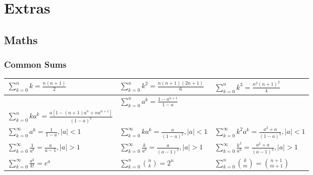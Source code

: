 \documentclass[twoside]{article}
\renewcommand{\arraystretch}{1.5} %
\begin{document}
{
[\vspace{2em}]
\section*{Extras}
}
{
\subsection*{Maths}
}
{
\subsubsection*{Common Sums}
}
\vspace{1em}
\bgroup
\def\arraystretch{3}
{\normalsize
  \begin{center}
    \begin{tabular}{| >{\centering}m{5cm}| >{\centering}m{5cm}| >{\centering}m{5cm}|}
      \hline
      $\sum_{k = 0}^n k = \frac{n(n + 1)}{2}$
       &
      $\sum_{k = 0}^n k^2 = \frac{n(n + 1)(2n + 1)}{6}$
       &
      $\sum_{k = 0}^n k^3 = \frac{n^2(n + 1)^2}{4}$
      \tabularnewline \hline
      \multicolumn{2}{|c|}{$\sum_{k = 0}^n k^4 = \frac{n}{30} (n + 1)(2n + 1)(3n^2 + 3n - 1)$}
       &
      $\sum_{k = 0}^n a^k = \frac{1 - a^{n + 1}}{1 - a}$
      \tabularnewline \hline
      $\sum_{k = 0}^n ka^k = \frac{a[1 - (n + 1)a^n + na^{n + 1}]}{(1 - a)^2}$
       &
      \multicolumn{2}{c|}{
      $\sum_{k = 0}^n k^2a^k = \frac{a[(1 + a) - (n + 1)^2a^n + (2n^2 + 2n - 1)a^{n + 1} - n^2a^{n + 2}]}{(1 - a)^3}$
      }
      \tabularnewline \hline
      $\sum_{k = 0}^\infty a^k = \frac{1}{1 - a}, |a| < 1$
       &
      $\sum_{k = 0}^\infty ka^k = \frac{a}{(1 - a)^2}, |a| < 1$
       &
      $\sum_{k = 0}^\infty k^2a^k = \frac{a^2 + a}{(1 - a)^3}, |a| < 1$
      \tabularnewline \hline
      $\sum_{k = 0}^\infty \frac{1}{a^k} = \frac{a}{a - 1}, |a| > 1$
       &
      $\sum_{k = 0}^\infty \frac{k}{a^k} = \frac{a}{(a - 1)^2}, |a| > 1$
       &
      $\sum_{k = 0}^\infty \frac{k^2}{a^k} = \frac{a^2 + a}{(a - 1)^3}, |a| > 1$
      \tabularnewline \hline
      $\sum_{k = 0}^\infty \frac{a^k}{k!} = e^a$
       &
      $\sum_{k = 0}^n \binom{n}{k} = 2^n$
       &
      $\sum_{k = 0}^n \binom{k}{m} = \binom{n + 1}{m + 1}$
      \tabularnewline \hline
    \end{tabular}
  \end{center}
}
\end{document}
